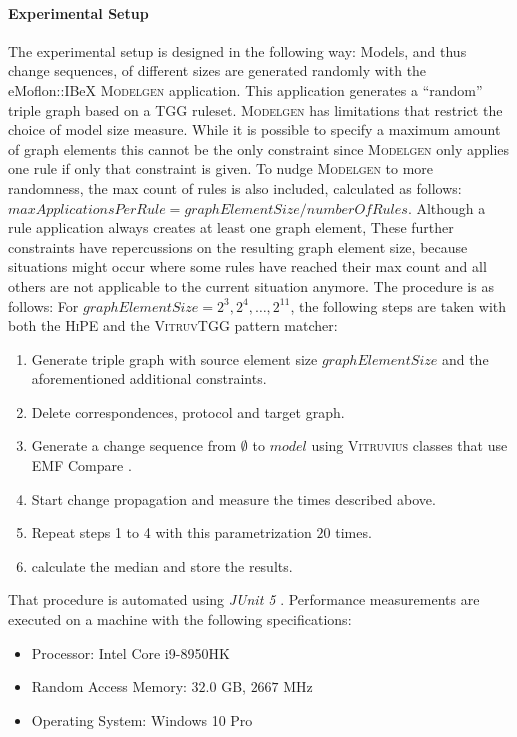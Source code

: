 \paragraph{Experimental Setup}
The experimental setup is designed in the following way:
Models, and thus change sequences, of different sizes are generated randomly with the eMoflon::IBeX \textsc{Modelgen} application. This application generates a \enquote{random} triple graph based on a TGG ruleset. \textsc{Modelgen} has limitations that restrict the choice of model size measure. While it is possible to specify a maximum amount of graph elements this cannot be the only constraint since \textsc{Modelgen} only applies one rule if only that constraint is given. To nudge \textsc{Modelgen} to more randomness, the max count of rules is also included, calculated as follows: $maxApplicationsPerRule=graphElementSize / numberOfRules$.
Although a rule application always creates at least one graph element, These further constraints have repercussions on the resulting graph element size, because situations might occur where some rules have reached their max count and all others are not applicable to the current situation anymore.
The procedure is as follows: For $graphElementSize = 2^3, 2^4, \dots, 2^{11}$, the following steps are taken with both the \textsc{HiPE} and the \textsc{VitruvTGG} pattern matcher:
\begin{enumerate}
    \item Generate triple graph with source element size $graphElementSize$ and the aforementioned additional constraints.
    \item Delete correspondences, protocol and target graph.
    \item Generate a change sequence from $\emptyset$ to $model$ using \textsc{Vitruvius} classes that use EMF Compare \cite{noauthor_emf_compare}.
    \item Start change propagation and measure the times described above.
    \item Repeat steps 1 to 4 with this parametrization $20$ times.
    \item calculate the median and store the results.
\end{enumerate}
That procedure is automated using \emph{JUnit 5} \cite{noauthor_junit_nodate}.
Performance measurements are executed on a machine with the following specifications:
\begin{itemize}
    \item Processor: Intel Core i9-8950HK
    \item Random Access Memory: $32.0$ GB, $2667$ MHz
    \item Operating System: Windows 10 Pro
\end{itemize}


